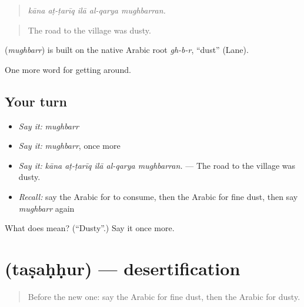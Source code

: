 \begin{quote}
\emph{kāna aṭ-ṭarīq ilā al-qarya mughbarran.}
\end{quote}

\begin{quote}
The road to the village was dusty.
\end{quote}

\begin{cousinweb}
\textbf{} (\emph{mughbarr}) is built on the native Arabic root \emph{gh-b-r}, \textquotedblleft{}dust\textquotedblright{} (Lane).
\end{cousinweb}

\begin{grammarlens}[title={What you've built}]
One more word for getting around.
\end{grammarlens}

\subsection*{Your turn}
\begin{itemize}
\raggedright
  \item \emph{Say it:} \emph{mughbarr}
  \item \emph{Say it:} \emph{mughbarr}, once more
  \item \emph{Say it:} \emph{kāna aṭ-ṭarīq ilā al-qarya mughbarran.} — The road to the village was dusty.
  \item \emph{Recall:} say the Arabic for to consume, then the Arabic for fine dust, then say \emph{mughbarr} again
\end{itemize}

\begin{tcolorbox}[breakable,colback=teal!4,colframe=teal!35!black,title={Before you move on}]
What does  mean? (\textquotedblleft{}Dusty\textquotedblright{}.) Say it once more.
\end{tcolorbox}
\section[\texorpdfstring{\ar{تصحر} (taṣaḥḥur)}{تصحر (taṣaḥḥur)}]{ (taṣaḥḥur) — desertification}

\label{lesson:AR-C466-tasahhur}



\begin{quote}
Before the new one: say the Arabic for fine dust, then the Arabic for dusty.
\end{quote}

